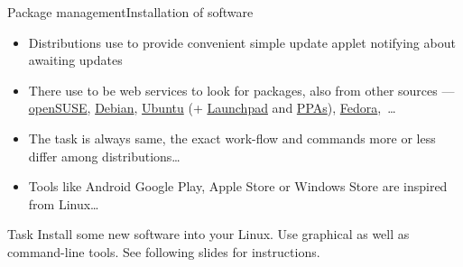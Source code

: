 \documentclass[compress, ucs, xelatex, 11pt, xcolor=svgnames, aspectratio=169,
	hyperref={
		bookmarks=true,
		unicode=true,
		colorlinks=true,
		pdftitle={Linux, command line and MetaCentrum},
		plainpages=false,
		pdfauthor={Vojtech Zeisek},
		pdfsubject={Course about use of Linux command line, writing shell scripts and using MetaCentrum of CESNET},
		pdfcreator={XeLaTeX},
		pdfkeywords={Linux, GNU, BASH, shell, command line, MetaCentrum},
		linkcolor=DarkRed, %
		anchorcolor=DarkBlue, %
		citecolor=Indigo, %
		filecolor=NavyBlue, %
		menucolor=DarkMagenta, %
		urlcolor=DarkBlue, %
		pdftex},
	url={hyphens, lowtilde} %
	]{beamer}
\begin{document}
\begin{frame}[allowframebreaks]{Package management}{Installation of software}
\begin{itemize}
		\begin{itemize}
			\item Ubuntu Software Center
			\item Synaptic --- feature rich, graphical, advances, for any DEB distribution (Debian, Ubuntu, Mint,~\ldots)
			\item Aptitude --- feature rich, command-line, advanced, for any DEB distribution (more advanced version of Apt)
			\item DPKG --- low-level, any DEB-based distribution
			\item YaST Software for openSUSE (feature rich, graphical as well as command-line)
			\item Zypper --- feature rich, command-line, advanced, for openSUSE
			\item DNF --- feature rich, command-line, advanced, for Fedora and another RPM based distributions (replacing older Yum)
			\item RPM --- low level, any RPM-based distribution
			\item GNOME software --- in most of distributions using GNOME
			\item And many more\ldots
		\end{itemize}
		\item Distributions use to provide convenient simple update applet notifying about awaiting updates
		\item There use to be web services to look for packages, also from other sources --- \href{https://software.opensuse.org/explore}{openSUSE}, \href{https://www.debian.org/distrib/packages\#search_packages}{Debian}, \href{https://packages.ubuntu.com/}{Ubuntu} (+ \href{https://launchpad.net/ubuntu/+search}{Launchpad} and \href{https://launchpad.net/ubuntu/+ppas}{PPAs}), \href{https://apps.fedoraproject.org/packages/}{Fedora},~\ldots
		\item The task is always same, the exact work-flow and commands more or less differ among distributions\ldots
		\item Tools like Android Google Play, Apple Store or Windows Store are inspired from Linux\ldots
	\end{itemize}
	\vfill
	\begin{block}{Task}
		Install some new software into your Linux. Use graphical as well as command-line tools. See following slides for instructions.
	\end{block}
\end{frame}
\end{document}
